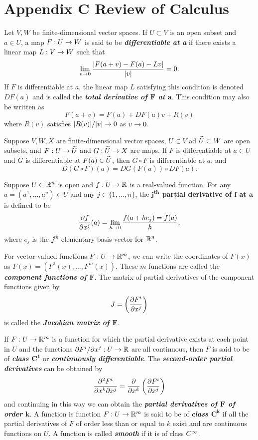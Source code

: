 \appendix
\setcounter{section}{2}
\section{Appendix C Review of Calculus}
\setcounter{thm}{0}

\dfn Let $V, W$ be finite-dimensional vector spaces. If $U\subset V$ is an open subset and $a\in U$, a map $F:U\rightarrow W$ is said to be \textbf{\textit{differentiable at a}} if there exists a linear map $L:V\rightarrow W$ such that
\[\lim_{v\rightarrow 0} \frac{|F(a + v) - F(a) - Lv|}{|v|} = 0.\]
If $F$ is differentiable at $a$, the linear map $L$ satisfying this condition is denoted $DF(a)$ and is called the \textbf{\textit{total derivative of $\boldsymbol F$ at $\boldsymbol a$}}. This condition may also be written as 
\[F(a + v) = F(a) + DF(a)v + R(v)\]
where $R(v)$ satisfies $|R(v)|/|v| \rightarrow 0$ as $v\rightarrow 0$.

\setcounter{thm}{2}

\begin{prop}
Suppose $V, W, X$ are finite-dimensional vector spaces, $U\subset V$ ad $\widetilde U \subset W$ are open subsets, and $F:U\rightarrow \widetilde U$ and $G:\widetilde U \rightarrow X$ are maps. If $F$ is differentiable at $a\in U$ and $G$ is differentiable at $F(a)\in \widetilde U$, then $G\circ F$ is differentiable at $a$, and 
\[D(G\circ F)(a) = DG(F(a)) \circ DF(a).\]
\end{prop}


\dfn Suppose $U\subset \mathbb{R}^n$ is open and $f:U\rightarrow \mathbb{R}$ is a real-valued function. For any $a = (a^1, \ldots, a^n)\in U$ and any $j\in \{1,\ldots, n\}$, the \textbf{$\boldsymbol{j^{th}}$ partial derivative of $\boldsymbol f$ at $\boldsymbol a$} is defined to be
\[\frac{\partial{f}}{\partial{x^j}}(a) = \lim_{h\rightarrow 0}\frac{f(a + he_j) = f(a)}{h},\]
where $e_j$ is the $j^{th}$ elementary basis vector for $\mathbb{R}^n$.


\dfn For vector-valued functions $F:U\rightarrow \mathbb{R}^m$, we can write the coordinates of $F(x)$ as $F(x) = (F^1(x),\ldots, F^m(x))$. These $m$ functions are called the \textbf{\textit{component functions of $\boldsymbol{F}$}}. The matrix of partial derivatives of the component functions given by 
\[J = \left(\frac{\partial F^i}{\partial x^j}\right)\]
is called the \textbf{\textit{Jacobian matrix of $\boldsymbol{F}$}}.


\dfn If $F:U\rightarrow \mathbb{R}^m$ is a function for which the partial derivative exists at each point in $U$ and the functions $\partial F^i/\partial x^j:U \rightarrow \mathbb{R}$ are all continuous, then $F$ is said to be of \textbf{\textit{class $\boldsymbol{C^1}$}} or \textbf{\textit{continuously differentiable}}. The \textbf{\textit{second-order partial derivatives}} can be obtained by
\[\frac{\partial^2 F^i}{\partial x^k \partial x^j} = \frac{\partial}{\partial x^k}\left( \frac{\partial F^i}{\partial x^j}\right)\]
and continuing in this way we can obtain the \textbf{\textit{partial derivatives of $\boldsymbol{F}$ of order $\boldsymbol{k}$}}. A function is function $F:U\rightarrow \mathbb{R}^m$ is said to be of \textbf{\textit{class $\boldsymbol{C^k}$}} if all the partial derivatives of $F$ of order less than or equal to $k$ exist and are continuous functions on $U$. A function is called \textbf{\textit{smooth}} if it is of class $C^\infty$.




